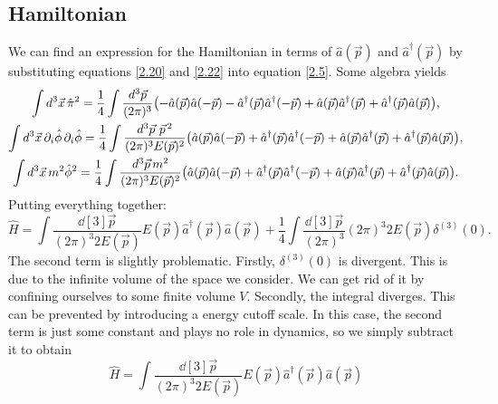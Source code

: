 \documentclass{article}
\begin{document}
\subsection{Hamiltonian}
We can find an expression for the Hamiltonian in terms of $ \hat{a}(\vec{p}) $ and $ \hat{a}^{\dagger}(\vec{p}) $ by substituting equations \eqref{2.20} and \eqref{2.22} into equation \eqref{2.5}. Some algebra yields
\begin{gather}
	\int\dd[3]{\vec{x}} \hat{\pi}^{2} = \frac{1}{4} \int \frac{\dd[3]{\vec{p}}}{(2\pi)^{3}} \qty(-\hat{a}(\vec{p})\hat{a}(-\vec{p}) - \hat{a}^{\dagger}(\vec{p})\hat{a}^{\dagger}(-\vec{p}) +\hat{a}(\vec{p})\hat{a}^{\dagger}(\vec{p}) + \hat{a}^{\dagger}(\vec{p}) \hat{a}(\vec{p})), \\
	\int \dd[3]{\vec{x}} \partial_{i} \hat{\phi} \, \partial_{i} \hat{\phi} = \frac{1}{4} \int \frac{\dd[3]{\vec{p}} \, \vec{p}^{\,2}}{(2\pi)^{3} E(\vec{p})^{2}} \qty( \hat{a}(\vec{p}) \hat{a}(-\vec{p}) + \hat{a}^{\dagger}(\vec{p}) \hat{a}^{\dagger}(-\vec{p}) + \hat{a}(\vec{p}) \hat{a}^{\dagger}(\vec{p}) + \hat{a}^{\dagger}(\vec{p}) \hat{a}(\vec{p}) ), \\
	\int \dd[3]{\vec{x}} m^{2} \hat{\phi}^{2} = \frac{1}{4} \int \frac{\dd[3]{\vec{p}} m^{2}}{(2\pi)^{3} E(\vec{p})^{2}} \qty( \hat{a}(\vec{p}) \hat{a}(-\vec{p}) + \hat{a}^{\dagger}(\vec{p}) \hat{a}^{\dagger}(-\vec{p}) + \hat{a}(\vec{p}) \hat{a}^{\dagger}(\vec{p}) + \hat{a}^{\dagger}(\vec{p}) \hat{a}(\vec{p}) ) .
\end{gather}
Putting everything together:
\begin{equation}
	\hat{H} = \int \frac{\dd[3]{\vec{p}}}{(2\pi)^{3} 2 E(\vec{p})} E(\vec{p}) \hat{a}^{\dagger}(\vec{p}) \hat{a}(\vec{p}) + \frac{1}{4} \int \frac{\dd[3]{\vec{p}}}{(2\pi)^{3}} (2\pi)^{3} 2 E(\vec{p}) \delta^{(3)}(0).
\end{equation}
The second term is slightly problematic. Firstly, $ \delta^{(3)}(0) $ is divergent. This is due to the infinite volume of the space we consider. We can get rid of it by confining ourselves to some finite volume $ V $. Secondly, the integral diverges. This can be prevented by introducing a energy cutoff scale. In this case, the second term is just some constant and plays no role in dynamics, so we simply subtract it to obtain
\begin{equation}
	\hat{H} = \int \frac{\dd[3]{\vec{p}}}{(2\pi)^{3} 2 E(\vec{p})} E(\vec{p}) \hat{a}^{\dagger}(\vec{p}) \hat{a}(\vec{p}) 
\end{equation}
\end{document}
